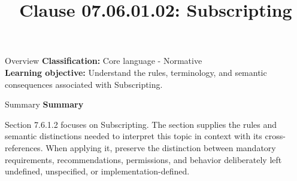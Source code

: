 \documentclass[10pt,letterpaper]{article}
\title{Clause 07.06.01.02: Subscripting}
\author{}
\date{}
\begin{document}
\maketitle
\begin{CornellOverviewBox}{Overview}
\textbf{Classification:} Core language - Normative\\[2pt]
\textbf{Learning objective:} Understand the rules, terminology, and semantic consequences associated with Subscripting.
\end{CornellOverviewBox}\begin{CornellSummaryBox}{Summary}
{\sffamily\bfseries\color{Accent} Summary}\par\vspace{3pt}Section 7.6.1.2 focuses on Subscripting. The section supplies the rules and semantic distinctions needed to interpret this topic in context with its cross-references. When applying it, preserve the distinction between mandatory requirements, recommendations, permissions, and behavior deliberately left undefined, unspecified, or implementation-defined.
\end{CornellSummaryBox}
\end{document}
